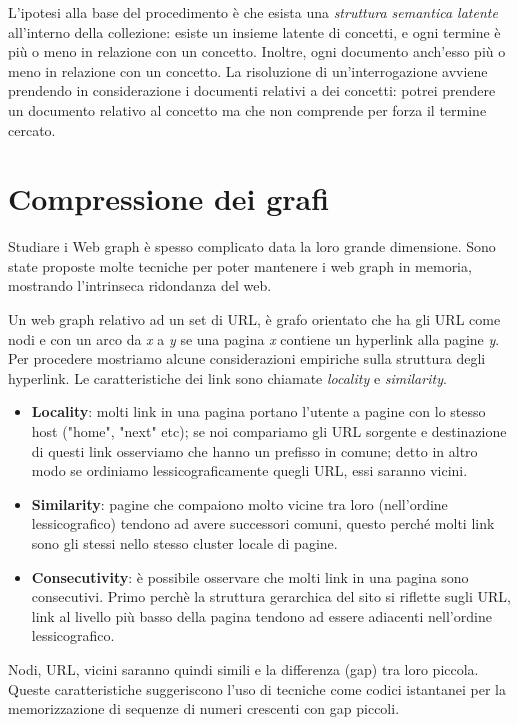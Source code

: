 \documentclass[12pt,italian]{report}
\begin{document}
L'ipotesi alla base del procedimento è che esista una \textit{struttura semantica latente} all'interno della collezione: esiste un insieme latente di concetti, e ogni termine è più o meno in relazione con un concetto. Inoltre, ogni documento anch'esso più o meno in relazione con un concetto. La risoluzione di un'interrogazione avviene prendendo in considerazione i documenti relativi a dei concetti: potrei prendere un documento relativo al concetto ma che non comprende per forza il termine cercato. 

\chapter{Compressione dei grafi}
\label{compressionedeigrafi}
Studiare i Web graph è spesso complicato data la loro grande dimensione. Sono state proposte molte tecniche per poter mantenere i web graph in memoria, mostrando l'intrinseca ridondanza del web. 

Un web graph relativo ad un set di URL, è grafo orientato che ha gli URL come nodi e con un arco da \textit{x} a \textit{y} se una pagina \textit{x} contiene un hyperlink alla pagine \textit{y}. Per procedere mostriamo alcune considerazioni empiriche sulla struttura degli hyperlink. Le caratteristiche dei link sono chiamate \textit{locality} e \textit{similarity}.
\begin{itemize}
    \item \textbf{Locality}: molti link in una pagina portano l'utente a pagine con lo stesso host ("home", "next" etc); se noi compariamo gli URL sorgente e destinazione di questi link osserviamo che hanno un prefisso in comune; detto in altro modo se ordiniamo lessicograficamente quegli URL, essi saranno vicini. 
    \item \textbf{Similarity}: pagine che compaiono molto vicine tra loro (nell'ordine lessicografico) tendono ad avere successori comuni, questo perché molti link sono gli stessi nello stesso cluster locale di pagine. 
    \item \textbf{Consecutivity}: è possibile osservare che molti link in una pagina sono consecutivi. Primo perchè la struttura gerarchica del sito si riflette sugli URL, link al livello più basso della pagina tendono ad essere adiacenti nell'ordine lessicografico. 
\end{itemize}

Nodi, URL, vicini saranno quindi simili e la differenza (gap) tra loro piccola.
Queste caratteristiche suggeriscono l'uso di tecniche come codici istantanei per la memorizzazione di sequenze di numeri crescenti con gap piccoli. 
\clearpage
\end{document}
